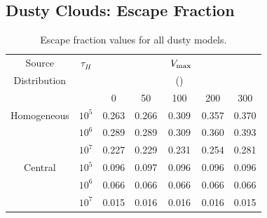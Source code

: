 \documentclass{emulateapj}
\newcommand{\kms}{{\ifmmode{{\mathrm{\,km\ s}^{-1}}}\else{\,km~s$^{-1}$}\fi}}
\begin{document}
\subsection{Dusty Clouds: Escape Fraction}
\label{sec:escapefraction}

\begin{table}
\begin{center}
\begin{tabular}{c ccc ccc}
\hline \hline
Source & $\tau_{H}$ & & & $\ V_{\rm max}$& & \\
Distribution& &  &  & (\kms) & & \\ 
& & 0 & 50 & 100 &200 & 300\\ \hline 
Homogeneous & $10^{5}$& 0.263 & 0.266 &  0.309 &  0.357 &  0.370  \\
            & $10^{6}$ & 0.289 &  0.289 &   0.309 &  0.360 &  0.393 \\
            &$10^{7}$ &  0.227 &  0.229 &  0.231 &  0.254 &  0.281 \\
Central & $10^{5}$ &  0.096 & 0.097 & 0.096 &  0.096 & 0.096 \\
  		&$10^{6}$ & 0.066 & 0.066 &  0.066 &  0.066 &  0.066 \\
 		&$10^{7}$ & 0.015 &  0.016 & 0.016 & 0.016 & 0.015 \\
\hline
\end{tabular}
\caption{
 Escape fraction values for all dusty models. } 
\label{table:escape}
\end{center}
\end{table}
\end{document}
